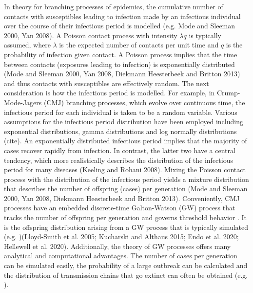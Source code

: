 \documentclass{imammb}
\numberwithin{equation}{section}
\begin{document}
In theory for branching processes of epidemics, the cumulative number of contacts with susceptibles leading to infection made by an infectious individual over the course of their infectious period is modelled (e.g. Mode and Sleeman 2000, Yan 2008). A Poisson contact process with intensity $\lambda q$ is typically assumed,  where $\lambda$ is the expected number of contacts per unit time and $q$ is the probability of infection given contact. A Poisson process implies that the time between contacts (exposures leading to infection) is exponentially distributed (Mode and Sleeman 2000, Yan 2008, Diekmann Heesterbeek and Britton 2013) and thus contacts with susceptibles are effectively random. The next consideration is how the infectious period is modelled. For example, in Crump-Mode-Jagers (CMJ) branching processes, which evolve over continuous time, the infectious period for each individual is taken to be a random variable. Various assumptions for the infectious period distribution have been employed including exponential distributions, gamma distributions and log normally distributions (cite). An exponentially distributed infectious period implies that the majority of cases recover rapidly from infection. In contrast, the latter two have a central tendency, which more realistically describes the distribution of the infectious period for many diseases (Keeling and Rohani 2008). Mixing the Poisson contact process with the distribution of the infectious period yields a mixture distribution that describes the number of offspring (cases) per generation (Mode and Sleeman 2000, Yan 2008, Diekmann Heesterbeek and Britton 2013). Conveniently, CMJ processes have an embedded discrete-time Galton-Watson (GW) process that tracks the number of offspring per generation and governs threshold behavior \citep{Mode2000-hp}. It is the offspring distribution arising from a GW process that is typically simulated (e.g. \citep{Lloyd-Smith2005-ma, Kucharski2015-lh, Endo2020-td, Hellewell2020-go})(Lloyd-Smith et al. 2005; Kucharski and Althaus 2015; Endo et al. 2020; Hellewell et al. 2020). Additionally, the theory of GW processes offers many analytical and computational advantages. The number of cases per generation can be simulated easily, the probability of a large outbreak can be calculated and the distribution of transmission chains that go extinct can often be obtained (e.g, \citep{Blumberg2013-xv}).
 
\end{document}
